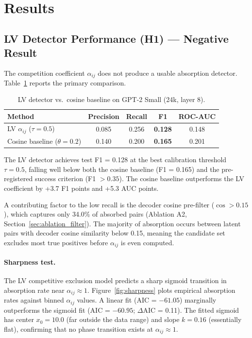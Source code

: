\documentclass{article}
\begin{document}
\section{Results}
\label{sec:results}

\subsection{LV Detector Performance (H1) --- Negative Result}
\label{sec:results_h1}

The competition coefficient $\alpha_{ij}$ does not produce a usable absorption detector. Table~\ref{tab:lv_detector} reports the primary comparison.

\begin{table}[t]
  \caption{LV detector vs.\ cosine baseline on GPT-2 Small (24k, layer 8).}
  \label{tab:lv_detector}
  \centering
  \small
  \begin{tabular}{@{}lcccc@{}}
    \toprule
    Method & Precision & Recall & F1 & ROC-AUC \\
    \midrule
    LV $\alpha_{ij}$ ($\tau = 0.5$) & 0.085 & 0.256 & \textbf{0.128} & 0.148 \\
    Cosine baseline ($\theta = 0.2$) & 0.140 & 0.200 & \textbf{0.165} & 0.201 \\
    \bottomrule
  \end{tabular}
\end{table}

The LV detector achieves test F1 = 0.128 at the best calibration threshold $\tau = 0.5$, falling well below both the cosine baseline (F1 = 0.165) and the pre-registered success criterion (F1 $> 0.35$). The cosine baseline outperforms the LV coefficient by +3.7 F1 points and +5.3 AUC points.

A contributing factor to the low recall is the decoder cosine pre-filter ($\cos > 0.15$), which captures only 34.0\% of absorbed pairs (Ablation A2, Section~\ref{sec:ablation_filter}). The majority of absorption occurs between latent pairs with decoder cosine similarity below 0.15, meaning the candidate set excludes most true positives before $\alpha_{ij}$ is even computed.

\paragraph{Sharpness test.} The LV competitive exclusion model predicts a sharp sigmoid transition in absorption rate near $\alpha_{ij} \approx 1$. Figure~\ref{fig:sharpness} plots empirical absorption rates against binned $\alpha_{ij}$ values. A linear fit (AIC = $-61.05$) marginally outperforms the sigmoid fit (AIC = $-60.95$; $\Delta$AIC = 0.11). The fitted sigmoid has center $x_0 = 10.0$ (far outside the data range) and slope $k = 0.16$ (essentially flat), confirming that no phase transition exists at $\alpha_{ij} \approx 1$.
\end{document}
